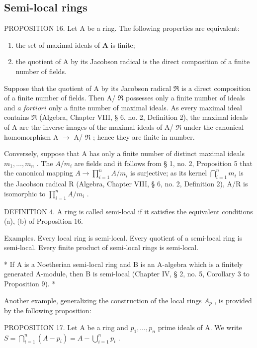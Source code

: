 \subsection{Semi-local rings}

PROPOSITION 16. Let A be a ring. The following properties are equivalent:

\begin{enumerate}
\def\labelenumi{(\alph{enumi})}
\item
  the set of maximal ideals of \(\mathbf{A}\) is finite;
\item
  the quotient of A by its Jacobson radical is the direct composition of a finite number of fields.
\end{enumerate}

Suppose that the quotient of A by its Jacobson radical \(\Re\) is a direct composition of a finite number of fields. Then A/ \(\Re\) possesses only a finite number of ideals and \(a\ fortiori\) only a finite number of maximal ideals. As every maximal ideal contains \(\Re\) (Algebra, Chapter VIII, § 6, no. 2, Definition 2), the maximal ideals of A are the inverse images of the maximal ideals of A/ \(\Re\) under the canonical homomorphism A \(\rightarrow\) A/ \(\Re\) ; hence they are finite in number.

Conversely, suppose that A has only a finite number of distinct maximal ideals \(m_{1}, \ldots, m_{n}\) . The \(A/m_{i}\) are fields and it follows from § 1, no. 2, Proposition 5 that the canonical mapping \(A \to \prod_{i=1}^{n} A/m_{i}\) is surjective; as its kernel \(\bigcap_{i=1}^{n} m_{i}\) is the Jacobson radical R (Algebra, Chapter VIII, § 6, no. 2, Definition 2), A/R is isomorphic to \(\prod_{i=1}^{n} A/m_{i}\) .

DEFINITION 4. A ring is called semi-local if it satisfies the equivalent conditions (a), (b) of Proposition 16.

Examples. Every local ring is semi-local. Every quotient of a semi-local ring is semi-local. Every finite product of semi-local rings is semi-local.

* If A is a Noetherian semi-local ring and B is an A-algebra which is a finitely generated A-module, then B is semi-local (Chapter IV, § 2, no. 5, Corollary 3 to Proposition 9). *

Another example, generalizing the construction of the local rings \(A_{p}\) , is provided by the following proposition:

PROPOSITION 17. Let A be a ring and \(p_1, \ldots, p_n\) prime ideals of A. We write \(S = \bigcap_{i=1}^{n} (A - p_i) = A - \bigcup_{i=1}^{n} p_i\) .

